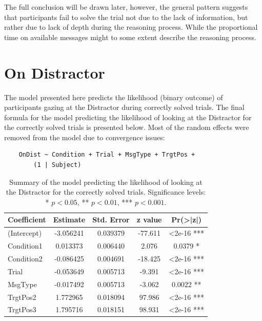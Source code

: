The full conclusion will be drawn later, however, the general pattern suggests that participants fail to solve the trial not due to the lack of information, but rather due to lack of depth during the reasoning process. While the proportional time on available messages might to some extent describe the reasoning process.
















\section{On Distractor}
\label{sec:distractor_model}

The model presented here predicts the likelihood (binary outcome) of participants gazing at the Distractor during correctly solved trials. The final formula for the model predicting the likelihood of looking at the Distractor for the correctly solved trials is presented below. Most of the random effects were removed from the model due to convergence issues:
\begin{verbatim}
    OnDist ~ Condition + Trial + MsgType + TrgtPos +
        (1 | Subject)
\end{verbatim}

\begin{table}[h!]
\centering
\begin{tabular}{|l|c|c|c|c|}
\hline
\textbf{Coefficient} & \textbf{Estimate} & \textbf{Std. Error} & \textbf{z value} & \textbf{Pr(>|z|)} \\ \hline
(Intercept)          & -3.056241         & 0.039379            & -77.611          & <2e-16 ***        \\ \hline
Condition1           & 0.013373          & 0.006440            & 2.076            & 0.0379 *          \\ \hline
Condition2           & -0.086425         & 0.004691            & -18.425          & <2e-16 ***        \\ \hline
Trial                & -0.053649         & 0.005713            & -9.391           & <2e-16 ***        \\ \hline
MsgType             & -0.017492         & 0.005713            & -3.062           & 0.0022 **         \\ \hline
TrgtPos2             & 1.772965          & 0.018094            & 97.986           & <2e-16 ***        \\ \hline
TrgtPos3             & 1.795716          & 0.018151            & 98.931           & <2e-16 ***        \\ \hline
\end{tabular}
\caption{Summary of the model predicting the likelihood of looking at the Distractor for the correctly solved trials. Significance levels: * $p < 0.05$, ** $p < 0.01$, *** $p < 0.001$.}
\label{tab:model_coefficients_distractor}
\end{table}

